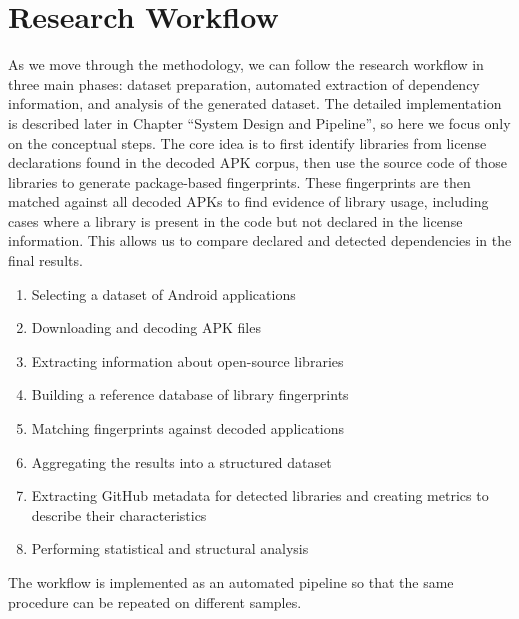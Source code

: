 \documentclass[12pt,a4paper]{report}
\begin{document}
\section{Research Workflow}
As we move through the methodology, we can follow the research workflow in three main phases: dataset preparation, automated extraction of dependency information, and analysis of the generated dataset. The detailed implementation is described later in Chapter ``System Design and Pipeline'', so here we focus only on the conceptual steps. The core idea is to first identify libraries from license declarations found in the decoded APK corpus, then use the source code of those libraries to generate package-based fingerprints. These fingerprints are then matched against all decoded APKs to find evidence of library usage, including cases where a library is present in the code but not declared in the license information. This allows us to compare declared and detected dependencies in the final results.


\begin{enumerate}
\item Selecting a dataset of Android applications
\item Downloading and decoding APK files
\item Extracting information about open-source libraries
\item Building a reference database of library fingerprints
\item Matching fingerprints against decoded applications
\item Aggregating the results into a structured dataset
\item Extracting GitHub metadata for detected libraries and creating metrics to describe their characteristics
\item Performing statistical and structural analysis
\end{enumerate}

The workflow is implemented as an automated pipeline so that the same procedure can be repeated on different samples.
\end{document}
